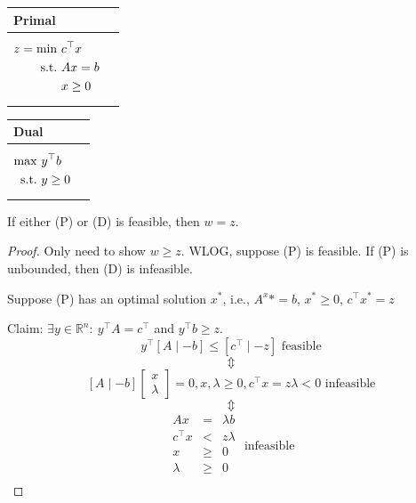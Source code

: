 \documentclass[11pt]{article}
\numberwithin{equation}{section}
\begin{document}
\begin{table}[!htb]
    \begin{minipage}[t]{.5\linewidth}
        \vspace{0pt}
        \centering
        \begin{tabular}{ll}
            Primal \\ \hline
            \parbox{5cm}{\begin{align*}
                z=\min \ & c^\top x \\
                \text{s.t.} \ & Ax= b \\
                \ & x \geq 0 \\
            \end{align*}}
        \end{tabular}
    \end{minipage}%
    \begin{minipage}[t]{.5\linewidth}
        \vspace{0pt}
        \centering
        \begin{tabular}{ll}
            Dual \\ \hline
            \parbox{5cm}{\begin{align*}
                \max \ & y^\top b \\
                \text{s.t.} \ &y \geq 0 \\
            \end{align*}}
        \end{tabular}
    \end{minipage} 
\end{table}

\begin{theorem}
    If either (P) or (D) is feasible, then $w=z$.
    \begin{proof}
        Only need to show $w \geq z$. WLOG, suppose (P) is feasible. If (P) is unbounded, then (D) is infeasible.

        Suppose (P) has an optimal solution $x^*$, i.e., $A^x*=b$, $x^* \geq 0$, $c^\top x^*=z$

        Claim: $\exists y \in \mathbb{R}^{n} :\ y^{\top} A=c^{\top}$ and $y^\top b \geq z$.
        $$y^{\top}[A \mid-b] \leqslant\left[c^{\top} \mid-z\right]\text{ feasible}$$
        $$\Updownarrow$$
        $$[A \mid-b]\left[\begin{array}{l}
            x \\
            \lambda
            \end{array}\right]=0, x, \lambda \geq 0, c^\top x=z\lambda < 0\text{ infeasible}$$
        $$\Updownarrow$$
        $$\begin{array}{lcl}
            Ax & = & \lambda b \\
            c^\top x & < & z\lambda \\
            x & \geq & 0 \\
            \lambda & \geq & 0 \\
            \end{array}\text{ infeasible}$$
    \end{proof}
\end{theorem}
\end{document}
